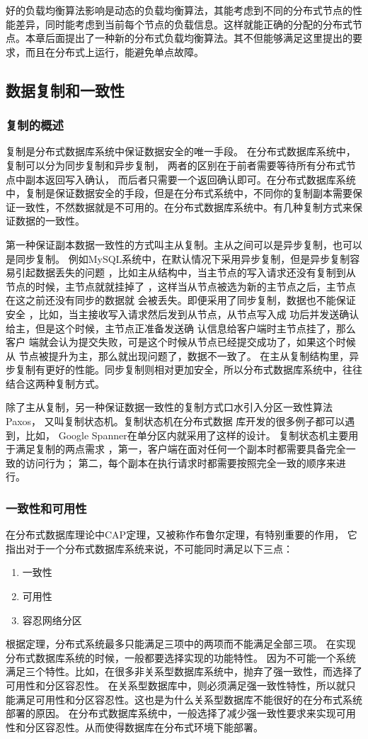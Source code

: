 	好的负载均衡算法影响是动态的负载均衡算法，其能考虑到不同的分布式节点的性能差异，同时能考虑到当前每个节点的负载信息。这样就能正确的分配的分布式节点。本章后面提出了一种新的分布式负载均衡算法。其不但能够满足这里提出的要求，而且在分布式上运行，能避免单点故障。
\subsection{数据复制和一致性}
\subsubsection{复制的概述}
复制是分布式数据库系统中保证数据安全的唯一手段。
在分布式数据库系统中，
复制可以分为同步复制和异步复制，
两者的区别在于前者需要等待所有分布式节点中副本返回写入确认，
而后者只需要一个返回确认即可。在分布式数据库系统中，复制是保证数据安全的手段，但是在分布式系统中，不同你的复制副本需要保证一致性，不然数据就是不可用的。在分布式数据库系统中。有几种复制方式来保证数据的一致性。

第一种保证副本数据一致性的方式叫主从复制。主从之间可以是异步复制，也可以是同步复制。
例如MySQL系统中，在默认情况下采用异步复制，但是异步复制容易引起数据丢失的问题
，比如主从结构中，当主节点的写入请求还没有复制到从节点的时候，主节点就就挂掉了
，这样当从节点被选为新的主节点之后，主节点在这之前还没有同步的数据就
会被丢失。即便采用了同步复制，数据也不能保证安全
，比如，当主接收写入请求然后发到从节点，从节点写入成
功后并发送确认给主，但是这个时候，主节点正准备发送确
认信息给客户端时主节点挂了，那么客户
端就会认为提交失败，可是这个时候从节点已经提交成功了，如果这个时候从
节点被提升为主，那么就出现问题了，数据不一致了。
在主从复制结构里，异步复制有更好的性能。同步复制则相对更加安全，所以分布式数据库系统中，往往结合这两种复制方式。

除了主从复制，另一种保证数据一致性的复制方式口水引入分区一致性算法Paxos，
又叫复制状态机。复制状态机在分布式数据
库开发的很多例子都可以遇到，比如，
Google Spanner在单分区内就采用了这样的设计。
复制状态机主要用于满足复制的两点需求
，第一，客户端在面对任何一个副本时都需要具备完全一致的访问行为；
第二，每个副本在执行请求时都需要按照完全一致的顺序来进行。
\subsubsection{一致性和可用性}
在分布式数据库理论中CAP定理，又被称作布鲁尔定理，有特别重要的作用，
它指出对于一个分布式数据库系统来说，不可能同时满足以下三点：
\begin{enumerate}
	\item 一致性
	\item 可用性
	\item 容忍网络分区
\end{enumerate}
根据定理，分布式系统最多只能满足三项中的两项而不能满足全部三项。
在实现分布式数据库系统的时候，一般都要选择实现的功能特性。
因为不可能一个系统满足三个特性。比如，在很多非关系型数据库系统中，抛弃了强一致性，而选择了可用性和分区容忍性。
在关系型数据库中，则必须满足强一致性特性，所以就只能满足可用性和分区容忍性。这也是为什么关系型数据库不能很好的在分布式系统部署的原因。
在分布式数据库系统中，一般选择了减少强一致性要求来实现可用性和分区容忍性。从而使得数据库在分布式环境下能部署。
